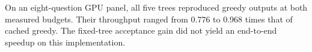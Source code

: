 On an eight-question GPU panel, all five trees reproduced greedy outputs at both measured budgets. Their throughput ranged from 0.776 to 0.968 times that of cached greedy. The fixed-tree acceptance gain did not yield an end-to-end speedup on this implementation.
